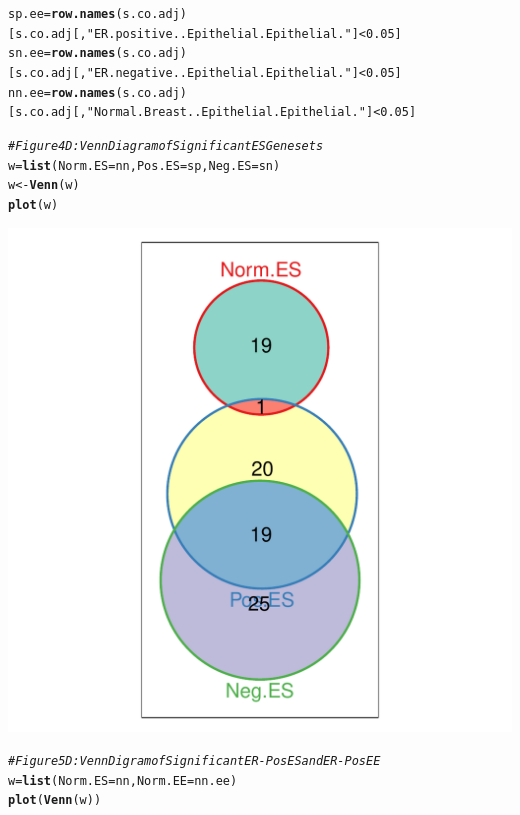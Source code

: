 \documentclass{article}\usepackage[]{graphicx}\usepackage[]{color}
\makeatletter
\def\maxwidth{ %
  \ifdim\Gin@nat@width>\linewidth
    \linewidth
  \else
    \Gin@nat@width
  \fi
}
\newcommand{\hlnum}[1]{\textcolor[rgb]{0.686,0.059,0.569}{#1}}%
\newcommand{\hlstr}[1]{\textcolor[rgb]{0.192,0.494,0.8}{#1}}%
\newcommand{\hlcom}[1]{\textcolor[rgb]{0.678,0.584,0.686}{\textit{#1}}}%
\newcommand{\hlopt}[1]{\textcolor[rgb]{0,0,0}{#1}}%
\newcommand{\hlstd}[1]{\textcolor[rgb]{0.345,0.345,0.345}{#1}}%
\newcommand{\hlkwb}[1]{\textcolor[rgb]{0.69,0.353,0.396}{#1}}%
\newcommand{\hlkwc}[1]{\textcolor[rgb]{0.333,0.667,0.333}{#1}}%
\newcommand{\hlkwd}[1]{\textcolor[rgb]{0.737,0.353,0.396}{\textbf{#1}}}%
\newenvironment{kframe}{%
 \def\at@end@of@kframe{}%
 \ifinner\ifhmode%
  \def\at@end@of@kframe{\end{minipage}}%
  \begin{minipage}{\columnwidth}%
 \fi\fi%
 \def\FrameCommand##1{\hskip\@totalleftmargin \hskip-\fboxsep
 \colorbox{shadecolor}{##1}\hskip-\fboxsep
     \hskip-\linewidth \hskip-\@totalleftmargin \hskip\columnwidth}%
 \MakeFramed {\advance\hsize-\width
   \@totalleftmargin\z@ \linewidth\hsize
   \@setminipage}}%
 {\par\unskip\endMakeFramed%
 \at@end@of@kframe}
\newenvironment{knitrout}{}{} %
\makeatother
\begin{document}
\begin{knitrout}
\begin{kframe}
\begin{alltt}
\hlstd{sp.ee}\hlkwb{=}\hlkwd{row.names}\hlstd{(s.co.adj)[s.co.adj[,}\hlstr{"ER.positive..Epithelial.Epithelial."}\hlstd{]}\hlopt{<}\hlnum{0.05}\hlstd{]}
\hlstd{sn.ee}\hlkwb{=}\hlkwd{row.names}\hlstd{(s.co.adj)[s.co.adj[,}\hlstr{"ER.negative..Epithelial.Epithelial."} \hlstd{]}\hlopt{<}\hlnum{0.05}\hlstd{]}
\hlstd{nn.ee}\hlkwb{=}\hlkwd{row.names}\hlstd{(s.co.adj)[s.co.adj[,}\hlstr{"Normal.Breast..Epithelial.Epithelial."}\hlstd{]}\hlopt{<}\hlnum{0.05}\hlstd{]}

\hlcom{# Figure 4D: Venn Diagram of Significant ES Genesets}
\hlstd{w}\hlkwb{=}\hlkwd{list}\hlstd{(}\hlkwc{Norm.ES}\hlstd{=nn,}\hlkwc{Pos.ES}\hlstd{=sp,}\hlkwc{Neg.ES}\hlstd{=sn)}
\hlstd{w} \hlkwb{<-} \hlkwd{Venn}\hlstd{(w)}
\hlkwd{plot}\hlstd{(w)}
\end{alltt}
\end{kframe}
\includegraphics[width=\maxwidth]{figure/Figure_4__Analysis_of_SANTA_Results-7} 
\begin{kframe}\begin{alltt}
\hlcom{# Figure 5D: Venn Digram of Significant ER-Pos ES and ER-Pos EE}
\hlstd{w}\hlkwb{=}\hlkwd{list}\hlstd{(}\hlkwc{Norm.ES}\hlstd{=nn,}\hlkwc{Norm.EE}\hlstd{=nn.ee)}
\hlkwd{plot}\hlstd{(}\hlkwd{Venn}\hlstd{(w))}
\end{alltt}
\end{kframe}

\end{knitrout}
\end{document}
